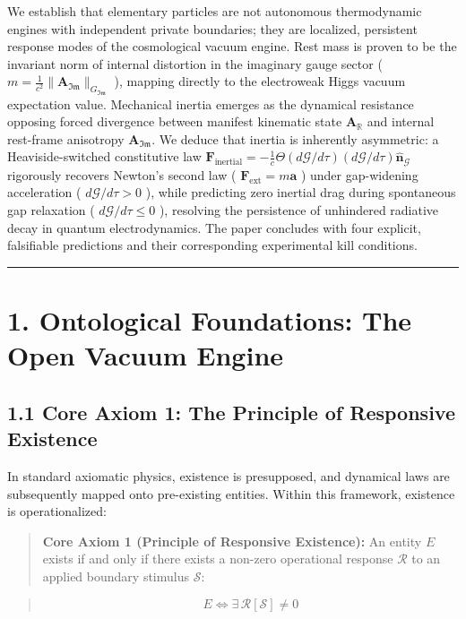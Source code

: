 \documentclass[11pt,a4paper]{article}
\theoremstyle{definition}\newtheorem{definition}{Definition}
\theoremstyle{remark}\newtheorem{remark}{Remark}
\begin{document}
We establish that elementary particles are not autonomous thermodynamic engines with independent private boundaries; they are localized, persistent response modes of the cosmological vacuum engine. Rest mass is proven to be the invariant norm of internal distortion in the imaginary gauge sector ( $m = \frac{1}{c^2} \|\mathbf{A}_{\mathfrak{Im}}\|_{G_{\mathfrak{Im}}}$ ), mapping directly to the electroweak Higgs vacuum expectation value. Mechanical inertia emerges as the dynamical resistance opposing forced divergence between manifest kinematic state $\mathbf{A}_{\mathbb{R}}$ and internal rest-frame anisotropy $\mathbf{A}_{\mathfrak{Im}}$. We deduce that inertia is inherently asymmetric: a Heaviside-switched constitutive law $\mathbf{F}_{\text{inertial}} = -\frac{1}{c} \Theta(d\mathcal{G}/d\tau) (d\mathcal{G}/d\tau) \hat{\mathbf{n}}_{\mathcal{G}}$ rigorously recovers Newton's second law ( $\mathbf{F}_{\text{ext}} = m\mathbf{a}$ ) under gap-widening acceleration ( $d\mathcal{G}/d\tau > 0$ ), while predicting zero inertial drag during spontaneous gap relaxation ( $d\mathcal{G}/d\tau \le 0$ ), resolving the persistence of unhindered radiative decay in quantum electrodynamics. The paper concludes with four explicit, falsifiable predictions and their corresponding experimental kill conditions.

\noindent\rule{\linewidth}{0.4pt}
\section{1. Ontological Foundations: The Open Vacuum Engine}
\subsection{1.1 Core Axiom 1: The Principle of Responsive Existence}

In standard axiomatic physics, existence is presupposed, and dynamical laws are subsequently mapped onto pre-existing entities. Within this framework, existence is operationalized:

\begin{quote}\textbf{Core Axiom 1 (Principle of Responsive Existence):} An entity $E$ exists if and only if there exists a non-zero operational response $\mathcal{R}$ to an applied boundary stimulus $\mathcal{S}$:\end{quote}
\begin{quote}\end{quote}
\begin{quote}
\begin{equation}
E \iff \exists\, \mathcal{R}[\mathcal{S}] \neq 0
\end{equation}
\end{quote}
\end{document}
